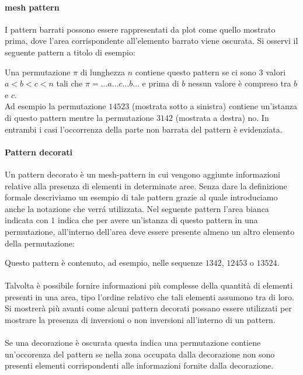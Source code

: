 \paragraph{mesh pattern} I pattern barrati possono essere rappresentati da plot come quello mostrato prima, dove l'area corrispondente all'elemento barrato viene oscurata. Si osservi il seguente pattern a titolo di esempio:
\begin{center}\end{center}
Una permutazione $\pi$ di lunghezza $n$ contiene questo pattern se ci sono 3 valori $a<b<c<n$ tali che $\pi=\dots{a}\dots{c}\dots{b}\dots$ e prima di $b$ nessun valore \`e compreso tra $b$ e $c$.\\
Ad esempio la permutazione $14523$ (mostrata sotto a sinistra) contiene un'istanza di questo pattern mentre la permutazione $3142$ (mostrata a destra) no. In entrambi i casi l'occorrenza della parte non barrata del pattern \`e evidenziata.
\begin{center}
\end{center}
\paragraph{Pattern decorati}Un pattern decorato \`e un mesh-pattern in cui vengono aggiunte informazioni relative alla presenza di elementi in determinate aree. Senza dare la definizione formale descriviamo un esempio di tale pattern grazie al quale introduciamo anche la notazione che verr\'a utilizzata. Nel seguente pattern l'area bianca indicata con $1$ indica che per avere un'istanza di questo pattern in una permutazione, all'interno dell'area deve essere presente almeno un altro elemento della permutazione: 
\begin{center}
\end{center}
Questo pattern \`e contenuto, ad esempio, nelle sequenze $1342$, $12453$ o $13524$.\\\\Talvolta \`e possibile fornire informazioni pi\`u complesse della quantit\`a di elementi presenti in una area, tipo l'ordine relativo che tali elementi assumono tra di loro. Si mostrer\`a pi\`u avanti come alcuni pattern decorati possano essere utilizzati per mostrare la presenza di inversioni o non inversioni all'interno di un pattern.\\\\Se una decorazione \`e oscurata questa indica una permutazione contiene un'occorenza del pattern se nella zona occupata dalla decorazione non sono presenti elementi corrispondenti alle informazioni fornite dalla decorazione. 
